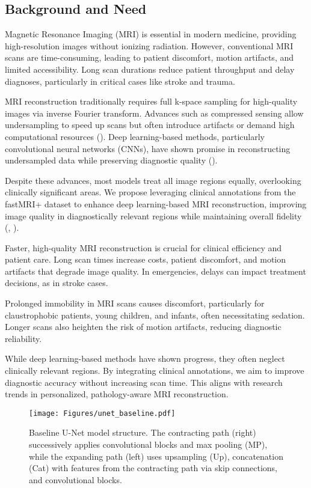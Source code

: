 \documentclass[
	letterpaper, %
]{jdf}
\begin{document}
\subsection{Background and Need} %

Magnetic Resonance Imaging (MRI) is essential in modern medicine, providing high-resolution images without ionizing radiation. However, conventional MRI scans are time-consuming, leading to patient discomfort, motion artifacts, and limited accessibility. Long scan durations reduce patient throughput and delay diagnoses, particularly in critical cases like stroke and trauma.

MRI reconstruction traditionally requires full k-space sampling for high-quality images via inverse Fourier transform. Advances such as compressed sensing allow undersampling to speed up scans but often introduce artifacts or demand high computational resources (\cite{hammernik2017learning}). Deep learning-based methods, particularly convolutional neural networks (CNNs), have shown promise in reconstructing undersampled data while preserving diagnostic quality (\cite{schlemper2017deep}).

Despite these advances, most models treat all image regions equally, overlooking clinically significant areas. We propose leveraging clinical annotations from the fastMRI+ dataset to enhance deep learning-based MRI reconstruction, improving image quality in diagnostically relevant regions while maintaining overall fidelity (\cite{fastMRI}, \cite{fast_mri_plus}).

Faster, high-quality MRI reconstruction is crucial for clinical efficiency and patient care. Long scan times increase costs, patient discomfort, and motion artifacts that degrade image quality. In emergencies, delays can impact treatment decisions, as in stroke cases.

Prolonged immobility in MRI scans causes discomfort, particularly for claustrophobic patients, young children, and infants, often necessitating sedation. Longer scans also heighten the risk of motion artifacts, reducing diagnostic reliability.

While deep learning-based methods have shown progress, they often neglect clinically relevant regions. By integrating clinical annotations, we aim to improve diagnostic accuracy without increasing scan time. This aligns with research trends in personalized, pathology-aware MRI reconstruction.

\begin{figure}[htbp] %
    \centering %
    \texttt{[image: Figures/unet\_baseline.pdf]}
    \caption{Baseline U-Net model structure. The contracting path (right) successively applies convolutional blocks and max pooling (MP), while the expanding path (left) uses upsampling (Up), concatenation (Cat) with features from the contracting path via skip connections, and convolutional blocks.}
    \label{fig:unet-baseline}
\end{figure}
\end{document}

